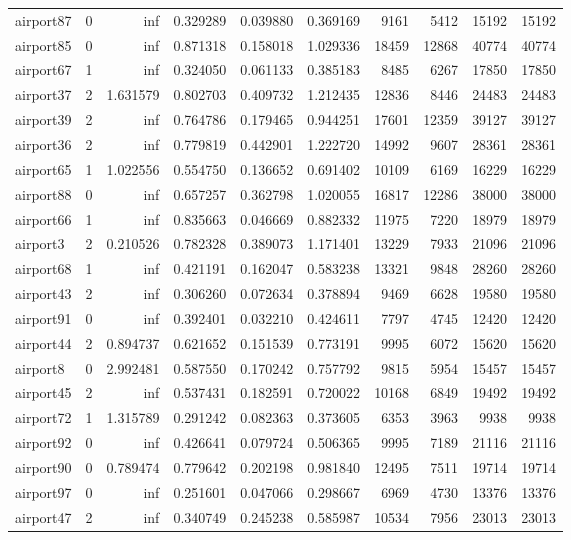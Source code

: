 \begin{longtable}{|l|r|r|r|r|r|r|r|r|r|}
airport87 & 0 & inf & 0.329289 & 0.039880 & 0.369169 & 9161 & 5412 & 15192 & 15192 \\
airport85 & 0 & inf & 0.871318 & 0.158018 & 1.029336 & 18459 & 12868 & 40774 & 40774 \\
airport67 & 1 & inf & 0.324050 & 0.061133 & 0.385183 & 8485 & 6267 & 17850 & 17850 \\
airport37 & 2 & 1.631579 & 0.802703 & 0.409732 & 1.212435 & 12836 & 8446 & 24483 & 24483 \\
airport39 & 2 & inf & 0.764786 & 0.179465 & 0.944251 & 17601 & 12359 & 39127 & 39127 \\
airport36 & 2 & inf & 0.779819 & 0.442901 & 1.222720 & 14992 & 9607 & 28361 & 28361 \\
airport65 & 1 & 1.022556 & 0.554750 & 0.136652 & 0.691402 & 10109 & 6169 & 16229 & 16229 \\
airport88 & 0 & inf & 0.657257 & 0.362798 & 1.020055 & 16817 & 12286 & 38000 & 38000 \\
airport66 & 1 & inf & 0.835663 & 0.046669 & 0.882332 & 11975 & 7220 & 18979 & 18979 \\
airport3 & 2 & 0.210526 & 0.782328 & 0.389073 & 1.171401 & 13229 & 7933 & 21096 & 21096 \\
airport68 & 1 & inf & 0.421191 & 0.162047 & 0.583238 & 13321 & 9848 & 28260 & 28260 \\
airport43 & 2 & inf & 0.306260 & 0.072634 & 0.378894 & 9469 & 6628 & 19580 & 19580 \\
airport91 & 0 & inf & 0.392401 & 0.032210 & 0.424611 & 7797 & 4745 & 12420 & 12420 \\
airport44 & 2 & 0.894737 & 0.621652 & 0.151539 & 0.773191 & 9995 & 6072 & 15620 & 15620 \\
airport8 & 0 & 2.992481 & 0.587550 & 0.170242 & 0.757792 & 9815 & 5954 & 15457 & 15457 \\
airport45 & 2 & inf & 0.537431 & 0.182591 & 0.720022 & 10168 & 6849 & 19492 & 19492 \\
airport72 & 1 & 1.315789 & 0.291242 & 0.082363 & 0.373605 & 6353 & 3963 & 9938 & 9938 \\
airport92 & 0 & inf & 0.426641 & 0.079724 & 0.506365 & 9995 & 7189 & 21116 & 21116 \\
airport90 & 0 & 0.789474 & 0.779642 & 0.202198 & 0.981840 & 12495 & 7511 & 19714 & 19714 \\
airport97 & 0 & inf & 0.251601 & 0.047066 & 0.298667 & 6969 & 4730 & 13376 & 13376 \\
airport47 & 2 & inf & 0.340749 & 0.245238 & 0.585987 & 10534 & 7956 & 23013 & 23013 \\

\end{longtable}
